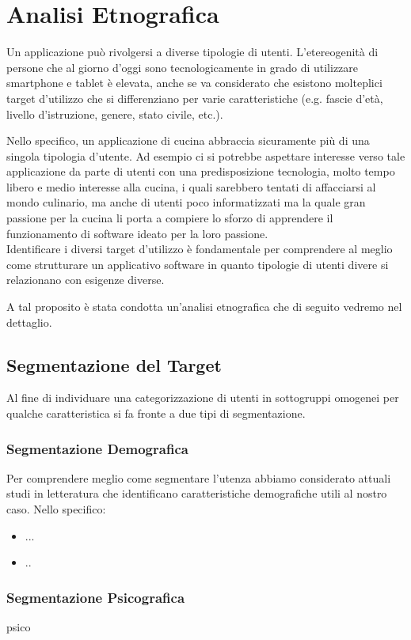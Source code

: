 \section{Analisi Etnografica}
Un applicazione può rivolgersi a diverse tipologie di utenti.
L'etereogenità di persone che al giorno d'oggi sono tecnologicamente in
grado di utilizzare smartphone e tablet è elevata, anche se va
considerato che esistono molteplici target d'utilizzo che si
differenziano per varie caratteristiche (e.g. fascie d'età, livello
d'istruzione, genere, stato civile, etc.).

Nello specifico, un applicazione di cucina abbraccia sicuramente più di
una singola tipologia d'utente. 
Ad esempio ci si potrebbe aspettare interesse verso tale applicazione
da parte di utenti 
con una predisposizione tecnologia, molto tempo
libero e medio interesse alla cucina, i quali sarebbero tentati di
affacciarsi al mondo culinario, ma anche di utenti poco informatizzati ma la
quale gran passione per la cucina li porta a compiere lo sforzo di
apprendere il funzionamento di software ideato per la
loro passione. \\

Identificare i diversi target d'utilizzo è fondamentale per comprendere
al meglio come strutturare un applicativo software in quanto tipologie
di utenti divere si relazionano con esigenze diverse.

A tal proposito è stata condotta un'analisi etnografica che di seguito vedremo nel dettaglio. 

\subsection{Segmentazione del Target}
Al fine di individuare una categorizzazione di utenti in sottogruppi
omogenei per qualche caratteristica si fa fronte a due tipi di
segmentazione.

\subsubsection{Segmentazione Demografica}
Per comprendere meglio come segmentare l'utenza abbiamo considerato
attuali studi in letteratura che identificano caratteristiche
demografiche utili al nostro caso.
Nello specifico:
\begin{itemize}
\item ...
\item ..
\end{itemize}

\subsubsection{Segmentazione Psicografica}
psico


